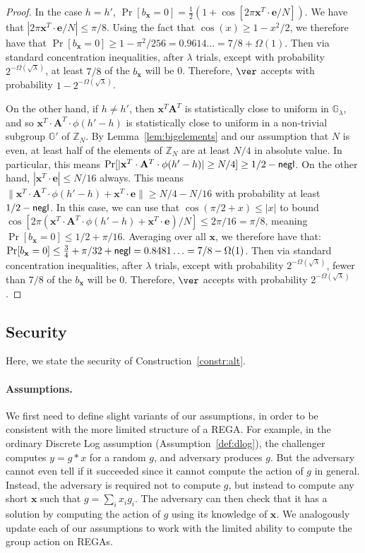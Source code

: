 \documentclass{article}\usepackage[a4paper,margin=20mm]{geometry}
\numberwithin{theorem}{section}
\numberwithin{equation}{section}
\newcommand{\Z}{\mathbb{Z}}
\newcommand{\G}{\mathbb{G}}
\newcommand{\ev}{{\mathbf{e}}}
\newcommand{\xv}{{\mathbf{x}}}
\newcommand{\Am}{{\mathbf{A}}}
\newcommand{\negl}{{\sf negl}}
\begin{document}
\begin{proof}
	
	In the case $h=h'$, $\Pr[b_\xv=0]=\frac{1}{2}\left(1+\cos\left[2\pi\xv^T\cdot\ev/N\right]\right)$. We have that $|2\pi\xv^T\cdot\ev/N|\leq \pi /8$. Using the fact that $\cos(x)\geq 1-x^2/2$, we therefore have that $\Pr[b_\xv=0]\geq 1-\pi^2/256=0.9614\ldots=7/8+\Omega(1)$. Then via standard concentration inequalities, after $\lambda$ trials, except with probability $2^{-\Omega(\sqrt{\lambda})}$, at least $7/8$ of the $b_\xv$ will be 0. Therefore, $\ver$ accepts with probability $1-2^{-\Omega(\sqrt{\lambda})}$.
	
	On the other hand, if $h\neq h'$, then $\xv^T\Am^T$ is statistically close to uniform in $\G_\lambda$, and so $\xv^T\cdot\Am^T\cdot\phi(h'-h)$ is statistically close to uniform in a non-trivial subgroup $\G'$ of $\Z_N$. By Lemma~\ref{lem:bigelements} and our assumption that $N$ is even, at least half of the elements of $\Z_N$ are at least $N/4$ in absolute value. In particular, this means $\Pr[|\xv^T\cdot\Am^T\cdot\phi(h'-h)|\geq N/4]\geq 1/2-\negl$. On the other hand, $|\xv^T\cdot\ev|\leq N/16$ always. This means $\|\xv^T\cdot\Am^T\cdot\phi(h'-h)+\xv^T\cdot\ev\|\geq N/4-N/16$ with probability at least $1/2-\negl$. In this case, we can use that $\cos(\pi/2+x)\leq |x|$ to bound $\cos\left[2\pi (\xv^T\cdot\Am^T\cdot\phi(h'-h)+\xv^T\cdot\ev)/N\right]\leq 2\pi/16=\pi/8$, meaning $\Pr[b_\xv=0]\leq 1/2+\pi/16$. Averaging over all $\xv$, we therefore have that: $\Pr[b_\xv=0]\leq \frac{3}{4}+\pi/32+\negl=0.8481\ldots=7/8-\Omega(1)$. Then via standard concentration inequalities, after $\lambda$ trials, except with probability $2^{-\Omega(\sqrt{\lambda})}$, fewer than $7/8$ of the $b_\xv$ will be 0. Therefore, $\ver$ accepts with probability $2^{-\Omega(\sqrt{\lambda})}$.
\end{proof}

\subsection{Security}

Here, we state the security of Construction~\ref{constr:alt}. 

\paragraph{Assumptions.} We first need to define slight variants of our assumptions, in order to be consistent with the more limited structure of a REGA. For example, in the ordinary Discrete Log assumption (Assumption~\ref{def:dlog}), the challenger computes $y=g*x$ for a random $g$, and adversary produces $g$. But the adversary cannot even tell if it succeeded since it cannot compute the action of $g$ in general. Instead, the adversary is required not to compute $g$, but instead to compute any short $\xv$ such that $g=\sum_i x_i g_i$. The adversary can then check that it has a solution by computing the action of $g$ using its knowledge of $\xv$. We analogously update each of our assumptions to work with the limited ability to compute the group action on REGAs.
\end{document}
